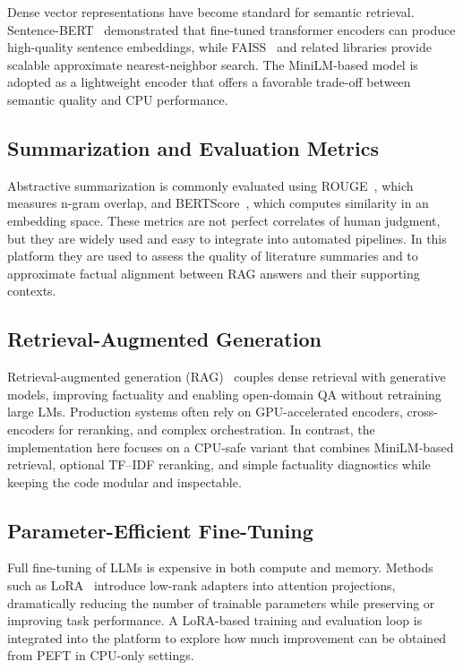 \documentclass[11pt]{article}
\begin{document}
Dense vector representations have become standard for semantic retrieval. Sentence-BERT~\citep{reimers2019sentencebert} demonstrated that fine-tuned transformer encoders can produce high-quality sentence embeddings, while FAISS~\citep{johnson2019faiss} and related libraries provide scalable approximate nearest-neighbor search. The MiniLM-based model  is adopted as a lightweight encoder that offers a favorable trade-off between semantic quality and CPU performance.

\subsection{Summarization and Evaluation Metrics}

Abstractive summarization is commonly evaluated using ROUGE~\citep{lin2004rouge}, which measures n-gram overlap, and BERTScore~\citep{zhang2020bertscore}, which computes similarity in an embedding space. These metrics are not perfect correlates of human judgment, but they are widely used and easy to integrate into automated pipelines. In this platform they are used to assess the quality of literature summaries and to approximate factual alignment between RAG answers and their supporting contexts.

\subsection{Retrieval-Augmented Generation}

Retrieval-augmented generation (RAG)~\citep{lewis2020rag} couples dense retrieval with generative models, improving factuality and enabling open-domain QA without retraining large LMs. Production systems often rely on GPU-accelerated encoders, cross-encoders for reranking, and complex orchestration. In contrast, the implementation here focuses on a CPU-safe variant that combines MiniLM-based retrieval, optional TF--IDF reranking, and simple factuality diagnostics while keeping the code modular and inspectable.

\subsection{Parameter-Efficient Fine-Tuning}

Full fine-tuning of LLMs is expensive in both compute and memory. Methods such as LoRA~\citep{hu2022lora} introduce low-rank adapters into attention projections, dramatically reducing the number of trainable parameters while preserving or improving task performance. A LoRA-based training and evaluation loop is integrated into the platform to explore how much improvement can be obtained from PEFT in CPU-only settings.
\end{document}
